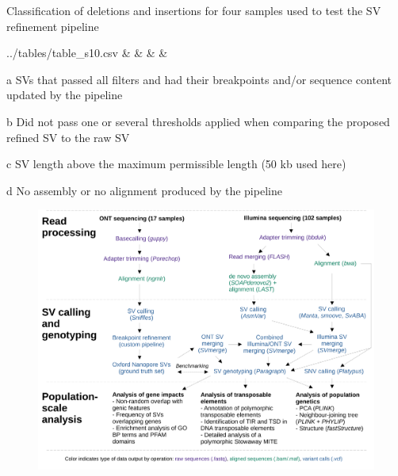 \documentclass[12pt]{article}
\newenvironment{lsfigure}
	{\begin{landscape} \begin{figure} \centering}
	{\end{figure} \end{landscape}}
\begin{document}
\begin{table}
	\centering
	\caption{Classification of deletions and insertions for four samples used to test the SV refinement pipeline}
	\label{table_s10}

	\begin{threeparttable}\small

		\csvreader[head to column names,
		tabular = l*4{c},
		table head = {\toprule Sample & Refined\tnote{a} & Below thresholds\tnote{b} & Above max. SVLEN\tnote{c} & No alignment\tnote{d} \\\midrule},%
			table foot = {\bottomrule}]%
		{../tables/table_s10.csv}%
		{}%
		{\sample &  & \belowthr & \svlen & \noalignment}

		\begin{tablenotes}\footnotesize
		\item[a] SVs that passed all filters and had their breakpoints and/or sequence content updated by the pipeline
		\item[b] Did not pass one or several thresholds applied when comparing the proposed refined SV to the raw SV
		\item[c] SV length above the maximum permissible length (50 kb used here)
		\item[d] No assembly or no alignment produced by the pipeline
		\end{tablenotes}
	\end{threeparttable}

\end{table}

\clearpage%

\begin{lsfigure}
	\includegraphics[width = 8.5in]{figure_s1_diagram}


	\label{fig_s1}
\end{lsfigure}
\end{document}

